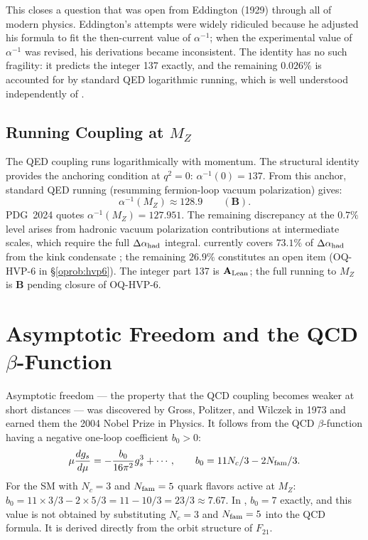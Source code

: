 \documentclass[11pt,openany]{book}
\theoremstyle{remark}
\newcommand{\GTE}{\text{GTE}}
\newcommand{\Nfam}{N_{\rm fam}}
\newcommand{\Nc}{N_c}
\newcommand{\CatAL}{\ensuremath{\textbf{A}_{\rm Lean}}}
\newcommand{\CatB}{\textbf{B}}
\begin{document}
This closes a question that was open from Eddington (1929) through all of modern
physics.  Eddington's attempts were widely ridiculed because he adjusted his formula
to fit the then-current value of $\alpha^{-1}$; when the experimental value of
$\alpha^{-1}$ was revised, his derivations became inconsistent.  The \GTE{} identity has
no such fragility: it predicts the integer 137 exactly, and the remaining $0.026\%$ is
accounted for by standard QED logarithmic running, which is well understood
independently of \GTE{}.

\subsection*{Running Coupling at $M_Z$}

The QED coupling runs logarithmically with momentum.  The \GTE{} structural identity
provides the anchoring condition at $q^2 = 0$: $\alpha^{-1}(0) = 137$.  From this
anchor, standard QED running (resumming fermion-loop vacuum polarization) gives:
\begin{equation}
  \alpha^{-1}(M_Z) \approx 128.9 \qquad (\CatB).
\end{equation}
PDG~2024 quotes $\alpha^{-1}(M_Z) = 127.951$.  The remaining discrepancy at the
$0.7\%$ level arises from hadronic vacuum polarization contributions at intermediate
scales, which require the full $\Delta\alpha_{\rm had}$ integral.  \GTE{} currently
covers $73.1\%$ of $\Delta\alpha_{\rm had}$ from the kink condensate
\cite{SpivackGTEUnification}; the remaining $26.9\%$ constitutes an open item
(OQ-HVP-6 in \S\ref{oprob:hvp6}).  The integer part 137 is \CatAL{}; the full running
to $M_Z$ is \CatB{} pending closure of OQ-HVP-6.

\section{Asymptotic Freedom and the QCD $\beta$-Function}
\label{sec:asymptotic}

Asymptotic freedom --- the property that the QCD coupling becomes weaker at short
distances --- was discovered by Gross, Politzer, and Wilczek in 1973 and earned them the
2004 Nobel Prize in Physics.  It follows from the QCD $\beta$-function having a negative
one-loop coefficient $b_0 > 0$:
\begin{equation}
  \mu \frac{d g_s}{d\mu} = -\frac{b_0}{16\pi^2} g_s^3 + \cdots,
  \qquad b_0 = 11\Nc/3 - 2\Nfam/3.
  \label{eq:qcd_beta}
\end{equation}
For the SM with $\Nc = 3$ and $\Nfam = 5$ quark flavors active at $M_Z$:
$b_0 = 11 \times 3/3 - 2 \times 5/3 = 11 - 10/3 = 23/3 \approx 7.67$.
In \GTE{}, $b_0 = 7$ exactly, and this value is not obtained by substituting $\Nc = 3$
and $\Nfam = 5$ into the QCD formula.  It is derived directly from the orbit structure
of $F_{21}$.
\end{document}
